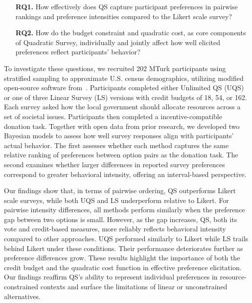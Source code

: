 \begin{itemize}
    \item [\textbf{RQ1.}] How effectively does QS capture participant preferences in pairwise rankings and preference intensities compared to the Likert scale survey?
    \item [\textbf{RQ2.}] How do the budget constraint and quadratic cost, as core components of Quadratic Survey, individually and jointly affect how well elicited preferences reflect participants' behavior?
\end{itemize}


To investigate these questions, we recruited 202 MTurk participants using stratified sampling to approximate U.S. census demographics, utilizing modified open-source software from~\cite{chengCanShowWhat2021}. 
Participants completed either Unlimited QS (UQS) or one of three Linear Survey (LS) versions with credit budgets of 18, 54, or 162. Each survey asked how the local government should allocate resources across a set of societal issues. Participants then completed a incentive-compatible donation task. Together with open data from prior research, we developed two Bayesian models to assess how well survey responses align with participants' actual behavior. The first assesses whether each method captures the same relative ranking of preferences between option pairs as the donation task. The second examines whether larger differences in reported survey preferences correspond to greater behavioral intensity, offering an interval-based perspective.

Our findings show that, in terms of pairwise ordering, QS outperforms Likert scale surveys, while both UQS and LS underperform relative to Likert. For pairwise intensity differences, all methods perform similarly when the preference gap between two options is small. However, as the gap increases, QS, both its vote and credit-based measures, more reliably reflects behavioral intensity compared to other approaches. UQS performed similarly to Likert while LS trails behind Likert under these conditions. Their performance deteriorates further as preference differences grow. These results highlight the importance of both the credit budget and the quadratic cost function in effective preference elicitation. Our findings reaffirm QS's ability to represent individual preferences in resource-constrained contexts and surface the limitations of linear or unconstrained alternatives.

